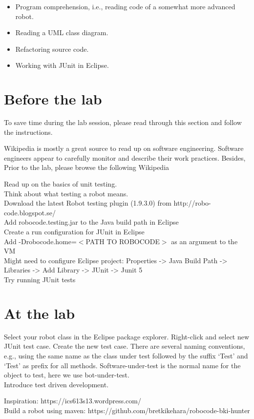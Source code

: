 \documentclass{scrreprt}
\begin{document}
\begin{itemize}
\item Program comprehension, i.e., reading code of a somewhat more advanced robot.
\item Reading a UML class diagram.
\item Refactoring source code.
\item Working with JUnit in Eclipse.
\end{itemize}

\chapter{Before the lab}
To save time during the lab session, please read through this section and follow the instructions.

Wikipedia is mostly a great source to read up on software engineering. Software engineers appear to carefully monitor and describe their work practices. Besides, Prior to the lab, please browse the following Wikipedia 


Read up on the basics of unit testing.\\
Think about what testing a robot means.\\
Download the latest Robot testing plugin (1.9.3.0) from http://robo-code.blogspot.se/\\
Add robocode.testing.jar to the Java build path in Eclipse\\
Create a run configuration for JUnit in Eclipse\\
Add -Drobocode.home=$<$PATH TO ROBOCODE$>$ as an argument to the VM\\
Might need to configure Eclipse project: Properties -> Java Build Path -> Libraries -> Add Library -> JUnit -> Junit 5\\
Try running JUnit tests

\chapter{At the lab}
Select your robot class in the Eclipse package explorer. Right-click and select new JUnit test case. Create the new test case. There are several naming conventions, e.g., using the same name as the class under test followed by the suffix `Test' and `Test' as prefix for all methods.
Software-under-test is the normal name for the object to test, here we use bot-under-test.\\
Introduce test driven development.

Inspiration: https://ics613s13.wordpress.com/\\
Build a robot using maven: https://github.com/bretkikehara/robocode-bki-hunter
\end{document}

